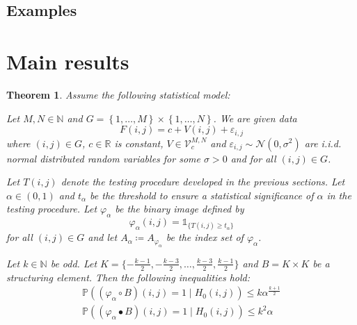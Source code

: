 \documentclass[a4paper,12pt]{article}
\theoremstyle{plain}
\newtheorem{theorem}{Theorem}[section]
\theoremstyle{definition}
\theoremstyle{remark}
\begin{document}
\newpage

\subsection{Examples}

\newpage

\section{Main results}

\begin{theorem}
	Assume the following statistical model:
	
	Let $M, N \in \mathbb{N}$ and $G = \left\{ 1, \dots, M \right\} \times  \left\{ 1, \dots, N \right\}$. We are given data
	\begin{equation}\label{f}
		F(i, j) = c + V(i, j) + \varepsilon_{i, j}
	\end{equation}
	where $(i, j) \in G$, $c \in \mathbb{R}$ is constant, $V \in \mathcal{V}_c^{M, N}$ and $\varepsilon_{i, j} \sim \mathcal{N}(0, \sigma^2)$ are i.i.d. normal distributed random variables for some $\sigma > 0$ and for all $(i, j) \in G$.
	
	Let $T(i, j)$ denote the testing procedure developed in the previous sections. Let $\alpha \in (0, 1)$ and $t_\alpha$ be the threshold to ensure a statistical significance of $\alpha$ in the testing procedure. Let $\varphi_\alpha$ be the binary image defined by
	\begin{equation}
		\varphi_\alpha(i, j) = \mathds{1}_{ \{ T(i, j) \geq t_\alpha \} }
	\end{equation}
	for all $(i, j) \in G$ and let $A_\alpha \coloneqq A_{\varphi_\alpha}$ be the index set of $\varphi_\alpha$.
	
	Let $k \in \mathbb{N}$ be odd. Let $K = \{ -\frac{k - 1}{2}, -\frac{k - 3}{2}, \dots, \frac{k - 3}{2}, \frac{k - 1}{2} \}$ and $B = K \times K$ be a structuring element.
	Then the following inequalities hold:
	\begin{align}
		\mathbb{P}((\varphi_\alpha \circ B)(i, j) = 1 \mid H_0(i, j)) \leq k \alpha^{\frac{k+1}{2}} \label{ineqopening} \\
		\mathbb{P}((\varphi_\alpha \bullet B)(i, j) = 1 \mid H_0(i, j)) \leq k^2 \alpha \label{ineqclosing}
	\end{align}
\end{theorem}
\end{document}
